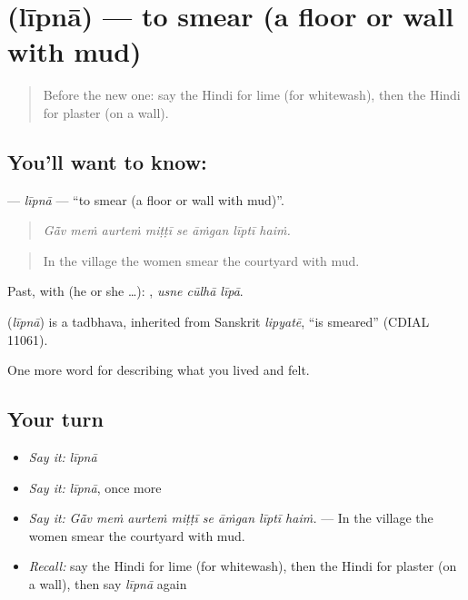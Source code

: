 \section[\texorpdfstring{\hi{लीपना} (līpnā)}{लीपना (līpnā)}]{ (līpnā) — to smear (a floor or wall with mud)}

\label{lesson:HI-C517-lipna}



\begin{quote}
Before the new one: say the Hindi for lime (for whitewash), then the Hindi for plaster (on a wall).
\end{quote}

\subsection*{You'll want to know: }
\textbf{} — \emph{līpnā} — \textquotedblleft{}to smear (a floor or wall with mud)\textquotedblright{}.

\begin{quote}
       
\end{quote}

\begin{quote}
\emph{Gā̃v meṁ aurteṁ miṭṭī se āṁgan līptī haiṁ.}
\end{quote}

\begin{quote}
In the village the women smear the courtyard with mud.
\end{quote}

Past, with  (he or she …):   , \emph{usne cūlhā līpā}.

\begin{cousinweb}
\textbf{} (\emph{līpnā}) is a tadbhava, inherited from Sanskrit \emph{lipyatē}, \textquotedblleft{}is smeared\textquotedblright{} (CDIAL 11061).
\end{cousinweb}

\begin{grammarlens}[title={What you've built}]
One more word for describing what you lived and felt.
\end{grammarlens}

\subsection*{Your turn}
\begin{itemize}
\raggedright
  \item \emph{Say it:} \emph{līpnā}
  \item \emph{Say it:} \emph{līpnā}, once more
  \item \emph{Say it:} \emph{Gā̃v meṁ aurteṁ miṭṭī se āṁgan līptī haiṁ.} — In the village the women smear the courtyard with mud.
  \item \emph{Recall:} say the Hindi for lime (for whitewash), then the Hindi for plaster (on a wall), then say \emph{līpnā} again
\end{itemize}

